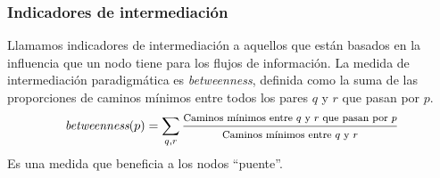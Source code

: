 \documentclass[a4paper,11pt]{book}
\theoremstyle{definition}
\begin{document}
\subsubsection{Indicadores de intermediación}
Llamamos indicadores de intermediación a aquellos que están basados en la influencia que un nodo tiene para los flujos de información.
%
%
La medida de intermediación paradigmática es \emph{betweenness}, definida como la suma de las proporciones de caminos mínimos entre todos los pares $q$ y $r$ que pasan por $p$.
%
\begin{equation}
	\emph{betweenness}(p) = {\footnotesize \sum_{q,r}\frac{\text{Caminos mínimos entre $q$ y $r$ que pasan por $p$}}{\text{Caminos mínimos entre $q$ y $r$}}}
\end{equation}
%
Es una medida que beneficia a los nodos ``puente''.
\end{document}
